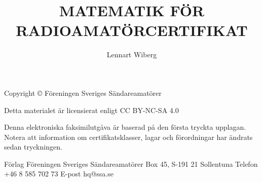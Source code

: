 \documentclass[a4paper,twoside,twocolumn,openright]{book}
\begin{document}
\frontmatter
\title{MATEMATIK FÖR RADIOAMATÖRCERTIFIKAT}
\author{Lennart Wiberg}
\maketitle




Copyright © Föreningen Sveriges Sändareamatörer

Detta materialet är licensierat enligt CC BY-NC-SA 4.0

Denna elektroniska faksimilutgåva är baserad på den första tryckta
upplagan. Notera att information om certifikatsklasser, lagar och
förordningar har ändrats sedan tryckningen.


Förlag
Föreningen Sveriges Sändareamatörer
Box 45, S-191 21 Sollentuna
Telefon +46 8 585 702 73
E-post hq@ssa.se


\tableofcontents

\mainmatter

%
%
%
%

%

%


%
%
%
%
%
%
%
%
%

%
%
%
%
%
%
%
%
%

%

%
%
%


%

%
%
%
%
%
%
%
%
%

\listoffigures
\listoftables


\end{document}
